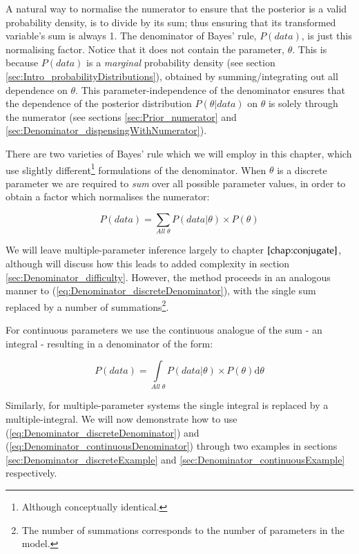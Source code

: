\documentclass[11pt,fullpage]{book}
\begin{document}
A natural way to normalise the numerator to ensure that the posterior is a valid probability density, is to divide by its sum; thus ensuring that its transformed variable's sum is always 1. The denominator of Bayes' rule, $P(data)$, is just this normalising factor. Notice that it does not contain the parameter, $\theta$. This is because $P(data)$ is a \textit{marginal} probability density (see section \ref{sec:Intro_probabilityDistributions}), obtained by summing/integrating out all dependence on $\theta$. This parameter-independence of the denominator ensures that the dependence of the posterior distribution $P(\theta|data)$ on $\theta$ is solely through the numerator (see sections \ref{sec:Prior_numerator} and \ref{sec:Denominator_dispensingWithNumerator}). 

There are two varieties of Bayes' rule which we will employ in this chapter, which use slightly different\footnote{Although conceptually identical.} formulations of the denominator. When $\theta$ is a discrete parameter we are required to \textit{sum} over all possible parameter values, in order to obtain a factor which normalises the numerator:

\begin{equation}\label{eq:Denominator_discreteDenominator}
P(data) = \sum\limits_{All\;\theta} P(data|\theta) \times P(\theta)
\end{equation}

We will leave multiple-parameter inference largely to chapter $\ref{chap:conjugate}$, although will discuss how this leads to added complexity in section \ref{sec:Denominator_difficulty}. However, the method proceeds in an analogous manner to (\ref{eq:Denominator_discreteDenominator}), with the single sum replaced by a number of summations\footnote{The number of summations corresponds to the number of parameters in the model.}.

For continuous parameters we use the continuous analogue of the sum - an integral - resulting in a denominator of the form:

\begin{equation}\label{eq:Denominator_continuousDenominator}
P(data) = \int\limits_{All\;\theta} P(data|\theta) \times P(\theta) \mathrm{d}\theta
\end{equation}

Similarly, for multiple-parameter systems the single integral is replaced by a multiple-integral. We will now demonstrate how to use (\ref{eq:Denominator_discreteDenominator}) and (\ref{eq:Denominator_continuousDenominator}) through two examples in sections \ref{sec:Denominator_discreteExample} and \ref{sec:Denominator_continuousExample} respectively.
\end{document}
